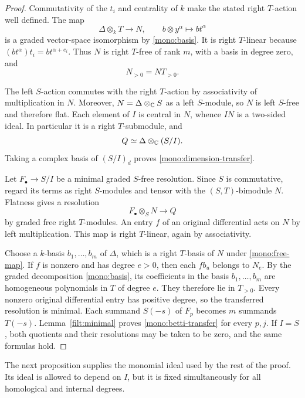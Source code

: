 \begin{proof}
Commutativity of the $t_i$ and centrality of $k$ make the stated right
$T$-action well defined.  The map
\begin{equation}
 \Delta\otimes_kT\longrightarrow N,
 \qquad b\otimes y^\alpha\longmapsto bt^\alpha
 \label{mono:free-map}
\end{equation}
is a graded vector-space isomorphism by \eqref{mono:basis}.  It is
right $T$-linear because $(bt^\alpha)t_i=bt^{\alpha+e_i}$.
Thus $N$ is right $T$-free of rank $m$, with a basis in degree zero,
and
\begin{equation}
                         N_{>0}=NT_{>0}.
 \label{mono:positive-degree}
\end{equation}

The left $S$-action commutes with the right $T$-action by associativity
of multiplication in $N$.  Moreover,
$N=\Delta\otimes_\mathbb C S$ as a left $S$-module, so $N$ is left $S$-free
and therefore flat.  Each element of $I$ is central in $N$, whence
$IN$ is a two-sided ideal.  In particular it is a right $T$-submodule,
and
\[
               Q\simeq\Delta\otimes_\mathbb C(S/I).
\]
Taking a complex basis of $(S/I)_d$ proves
\eqref{mono:dimension-transfer}.

Let $F_\bullet\to S/I$ be a minimal graded $S$-free resolution.
Since $S$ is commutative, regard its terms as right $S$-modules and
tensor with the $(S,T)$-bimodule $N$.  Flatness gives a resolution
\[
                    F_\bullet\otimes_SN\longrightarrow Q
\]
by graded free right $T$-modules.  An entry $f$ of an original
differential acts on $N$ by left multiplication.  This map is right
$T$-linear, again by associativity.

Choose a $k$-basis $b_1,\ldots,b_m$ of $\Delta$, which is a right
$T$-basis of $N$ under \eqref{mono:free-map}.  If $f$ is nonzero and
has degree $e>0$, then each $fb_u$ belongs to $N_e$.  By the graded
decomposition \eqref{mono:basis}, its coefficients in the basis
$b_1,\ldots,b_m$ are homogeneous polynomials in $T$ of degree $e$.
They therefore lie in $T_{>0}$.  Every nonzero original differential
entry has positive degree, so the transferred resolution is minimal.
Each summand $S(-s)$ of $F_p$ becomes $m$ summands $T(-s)$.
Lemma~\ref{filt:minimal} proves \eqref{mono:betti-transfer} for every
$p,j$.  If $I=S$, both quotients and their resolutions may be taken
to be zero, and the same formulas hold.
\end{proof}

The next proposition supplies the monomial ideal used by the rest of
the proof.  Its ideal is allowed to depend on $I$, but it is fixed
simultaneously for all homological and internal degrees.

